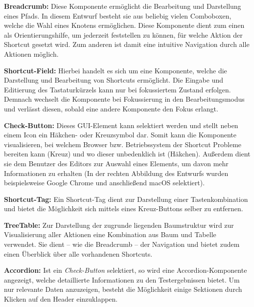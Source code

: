  \textbf{Breadcrumb:} Diese Komponente ermöglicht die Bearbeitung und Darstellung eines Pfads. In diesem Entwurf besteht sie aus beliebig vielen Comboboxen, welche die Wahl eines Knotens ermöglichen. Diese Komponente dient zum einen als Orientierungshilfe, um jederzeit feststellen zu können, für welche Aktion der Shortcut gesetzt wird. Zum anderen ist damit eine intuitive Navigation durch alle Aktionen möglich.

 \textbf{Shortcut-Field:} Hierbei handelt es sich um eine Komponente, welche die Darstellung und Bearbeitung von Shortcuts ermöglicht. Die Eingabe und Editierung des Tastaturkürzels kann nur bei fokussiertem Zustand erfolgen. Demnach wechselt die Komponente bei Fokussierung in den Bearbeitungsmodus und verlässt diesen, sobald eine andere Komponente den Fokus erlangt.

 \textbf{Check-Button:} Dieses GUI-Element kann selektiert werden und stellt neben einem Icon ein Häkchen- oder Kreuzsymbol dar. Somit kann die Komponente visualisieren, bei welchem Browser bzw. Betriebssystem der Shortcut Probleme bereiten kann (Kreuz) und wo dieser unbedenklich ist (Häkchen). Außerdem dient sie dem Benutzer des Editors zur Auswahl eines Elements, um davon mehr Informationen zu erhalten (In der rechten Abbildung des Entwurfs wurden beispielsweise Google Chrome und anschließend macOS selektiert).

 \textbf{Shortcut-Tag:} Ein Shortcut-Tag dient zur Darstellung einer Tastenkombination und bietet die Möglichkeit sich mittels eines Kreuz-Buttons selber zu entfernen.

 \textbf{TreeTable:} Zur Darstellung der zugrunde liegenden Baumstruktur wird zur Visualisierung aller Aktionen eine Kombination aus Baum und Tabelle verwendet. Sie dient -- wie die Breadcrumb -- der Navigation und bietet zudem einen Überblick über alle vorhandenen Shortcuts.

 \textbf{Accordion:} Ist ein \emph{Check-Button} selektiert, so wird eine Accordion-Komponente angezeigt, welche detaillierte Informationen zu den Testergebnissen bietet. Um nur relevante Daten anzuzeigen, besteht die Möglichkeit einige Sektionen durch Klicken auf den Header einzuklappen.

\vfill

